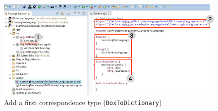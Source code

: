 \begin{figure}[htbp]
\begin{center}
  \includegraphics[width=\textwidth]{newSchema}
  \caption{Add a first correspondence type (\texttt{BoxToDictionary})}  
  \label{newSchema}
\end{center}
\end{figure}






